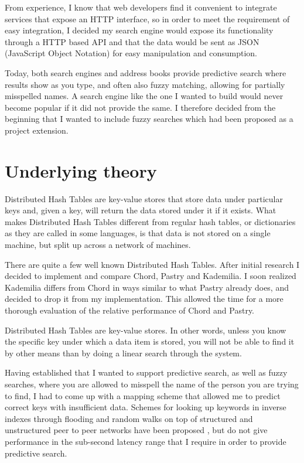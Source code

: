 From experience, I know that web developers find it convenient to integrate services that expose an HTTP interface, so in order to meet the requirement of easy integration, I decided my search engine would expose its functionality through a HTTP based API and that the data would be sent as JSON (JavaScript Object Notation) for easy manipulation and consumption.

Today, both search engines and address books provide predictive search where results show as you type, and often also fuzzy matching, allowing for partially misspelled names. A search engine like the one I wanted to build would never become popular if it did not provide the same. I therefore decided from the beginning that I wanted to include fuzzy searches which had been proposed as a project extension.

\section{Underlying theory}
Distributed Hash Tables are key-value stores that store data under particular keys and, given a key, will return the data stored under it if it exists.
What makes Distributed Hash Tables different from regular hash tables, or dictionaries as they are called in some languages, is that data is not stored on a single machine, but split up across a network of machines.

There are quite a few well known Distributed Hash Tables. After initial research I decided to implement and compare Chord, Pastry and Kademilia. I soon realized Kademilia differs from Chord in ways similar to what Pastry already does, and decided to drop it from my implementation. This allowed the time for a more thorough evaluation of the relative performance of Chord and Pastry.

Distributed Hash Tables are key-value stores. In other words, unless you know the specific key under which a data item is stored, you will not be able to find it by other means than by doing a linear search through the system.

Having established that I wanted to support predictive search, as well as fuzzy searches, where you are allowed to misspell the name of the person you are trying to find, I had to come up with a mapping scheme that allowed me to predict correct keys with insufficient data. 
Schemes for looking up keywords in inverse indexes through flooding and random walks on top of structured and unstructured peer to peer networks have been proposed \cite{myths}, but do not give performance in the sub-second latency range that I require in order to provide predictive search.

